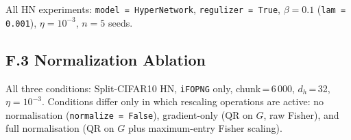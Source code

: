 All HN experiments: \texttt{model = HyperNetwork}, \texttt{regulizer = True},
$\beta = 0.1$ (\texttt{lam = 0.001}), $\eta = 10^{-3}$, $n = 5$ seeds.

\begin{table}[H]
\centering
\caption{%
    \textbf{Hypernetwork architecture and training parameters.}
    \texttt{c\_emb} = chunk embedding dim; \texttt{t\_emb} = task embedding dim;
    \texttt{max\_dir} = maximum gradient memory directions.
    $^\dagger$The CIFAR-100 HN results are extracted from the 35 completed
    runs at chunk\,=\,6\,000, $d_h$\,=\,32, \texttt{normalize\,=\,True};
    remaining runs are exploratory pilots.
}
\label{tab:hp_hn}
\end{table}

\subsection*{F.3 \quad Normalization Ablation}
\label{app:hyperparameters_norm}

All three conditions: Split-CIFAR10 HN, \texttt{iFOPNG} only,
chunk\,=\,6\,000, $d_h$\,=\,32, $\eta = 10^{-3}$.
Conditions differ only in which rescaling operations are active:
no normalisation (\texttt{normalize\,=\,False}), gradient-only
(QR on $G$, raw Fisher), and full normalisation (QR on $G$ plus
maximum-entry Fisher scaling).
